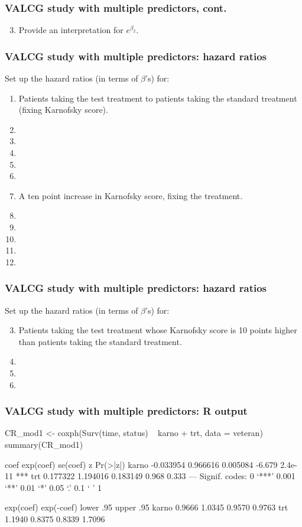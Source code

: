\begin{frame}
\frametitle{VALCG study with multiple predictors, cont.}
\begin{enumerate}
\setcounter{enumi}{2}
\item Provide an interpretation for $e^{\beta_2}$.
\end{enumerate}
\vskip300pt
\end{frame}

\begin{frame}
\frametitle{VALCG study with multiple predictors: hazard ratios}
Set up the hazard ratios (in terms of $\beta$'s) for:
\begin{enumerate}
\item Patients taking the test treatment to patients taking the standard treatment (fixing Karnofsky score).
\item[]
\item[]
\item[]
\item[]
\item[]
\item A ten point increase in Karnofsky score, fixing the treatment.
\item[]
\item[]
\item[]
\item[]
\item[]
\end{enumerate}
\end{frame}

\begin{frame}
\frametitle{VALCG study with multiple predictors: hazard ratios}
Set up the hazard ratios (in terms of $\beta$'s) for:
\begin{enumerate}
\setcounter{enumi}{2}
\item Patients taking the test treatment whose Karnofsky score is 10 points higher than patients taking the standard treatment.
\item[]
\item[]
\item[]
\end{enumerate}
\vskip200pt
\end{frame}

\begin{frame}[fragile]
\frametitle{VALCG study with multiple predictors: R output}
\begin{Rcode}{-.07}
CR_mod1 <- coxph(Surv(time, status) ~ karno + trt, data = veteran)
summary(CR_mod1)
\end{Rcode}
\vskip5pt
\begin{Rout}{-.07}
           coef exp(coef)  se(coef)      z Pr(>|z|)
karno -0.033954  0.966616  0.005084 -6.679  2.4e-11 ***
trt    0.177322  1.194016  0.183149  0.968    0.333
---
Signif. codes:  0 ‘***’ 0.001 ‘**’ 0.01 ‘*’ 0.05 ‘.’ 0.1 ‘ ’ 1

      exp(coef) exp(-coef) lower .95 upper .95
karno    0.9666     1.0345    0.9570    0.9763
trt      1.1940     0.8375    0.8339    1.7096
\end{Rout}
\end{frame}

